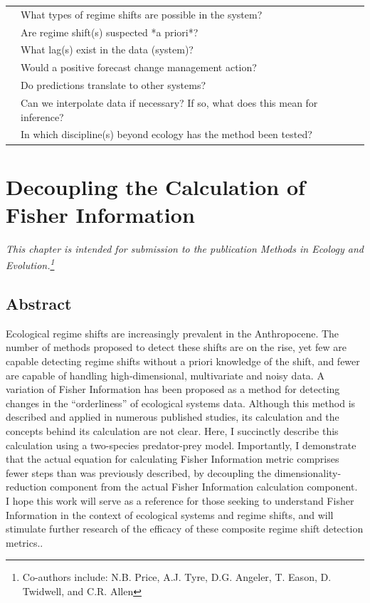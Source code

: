 \documentclass[12pt,twoside,openany]{reedthesis}
\begin{document}
\begin{longtable}{>{\bfseries}l|>{\raggedright\arraybackslash}p{30em}}
 & What types of regime shifts are possible in the system?\\
\addlinespace
 & Are regime shift(s) suspected *a priori*?\\
 & What lag(s) exist in the data (system)?\\
 & Would a positive forecast change management action?\\
 & Do predictions translate to other systems?\\
 & Can we interpolate data if necessary? If so, what does this mean for inference?\\
\addlinespace
 & In which discipline(s) beyond ecology has the method been tested?\\
\bottomrule
\end{longtable}
\hypertarget{fiGuide}{%
\chapter{Decoupling the Calculation of Fisher Information}\label{fiGuide}}

\emph{This chapter is intended for submission to the publication \emph{Methods in Ecology and Evolution}.\footnote{Co-authors include: N.B. Price, A.J. Tyre, D.G. Angeler, T. Eason, D. Twidwell, and C.R. Allen}}

\hypertarget{abstract-1}{%
\section{Abstract}\label{abstract-1}}

Ecological regime shifts are increasingly prevalent in the Anthropocene. The number of methods proposed to detect these shifts are on the rise, yet few are capable detecting regime shifts without a priori knowledge of the shift, and fewer are capable of handling high-dimensional, multivariate and noisy data. A variation of Fisher Information has been proposed as a method for detecting changes in the ``orderliness'' of ecological systems data. Although this method is described and applied in numerous published studies, its calculation and the concepts behind its calculation are not clear. Here, I succinctly describe this calculation using a two-species predator-prey model. Importantly, I demonstrate that the actual equation for calculating Fisher Information metric comprises fewer steps than was previously described, by decoupling the dimensionality-reduction component from the actual Fisher Information calculation component. I hope this work will serve as a reference for those seeking to understand Fisher Information in the context of ecological systems and regime shifts, and will stimulate further research of the efficacy of these composite regime shift detection metrics..
\end{document}
